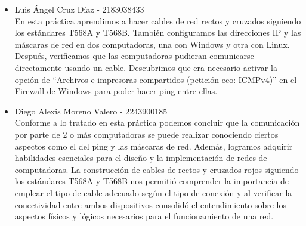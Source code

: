     \begin{itemize}
    \item Luis Ángel Cruz Díaz - 2183038433\\
        En esta práctica aprendimos a hacer cables de red rectos y cruzados siguiendo los estándares T568A y T568B. También configuramos las direcciones IP y las máscaras de red en dos computadoras, una con Windows y otra con Linux. Después, verificamos que las computadoras pudieran comunicarse directamente usando un cable. Descubrimos que era necesario activar la opción de ``Archivos e impresoras compartidos (petición eco: ICMPv4)'' en el Firewall de Windows para poder hacer ping entre ellas.
    \item Diego Alexis Moreno Valero - 2243900185\\
        Conforme a lo tratado en esta práctica podemos concluir que la comunicación por parte de 2 o más computadoras se puede realizar conociendo ciertos aspectos como el del ping y las máscaras de red. Además, logramos adquirir habilidades esenciales para el diseño y la implementación de redes de computadoras. La construcción de cables de rectos y cruzados rojos siguiendo los estándares T568A y T568B nos permitió comprender la importancia de emplear el tipo de cable adecuado según el tipo de conexión y al verificar la conectividad entre ambos dispositivos consolidó el entendimiento sobre los aspectos físicos y lógicos necesarios para el funcionamiento de una red.
    \end{itemize}

